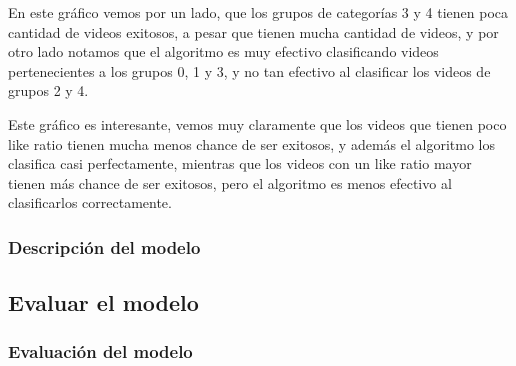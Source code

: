         \def\path{clasif_error_category.png}
        \def\text{Clasif. errors vs category}
        

        En este gráfico vemos por un lado, que los grupos de categorías 3 y 4
        tienen poca cantidad de videos exitosos, a pesar que tienen mucha
        cantidad de videos, y por otro lado notamos que el algoritmo es muy
        efectivo clasificando videos pertenecientes a los grupos 0, 1 y 3, y
        no tan efectivo al clasificar los videos de grupos 2 y 4.

        \def\path{clasif_error_likes_ratio.png}
        \def\text{Clasif. errors vs like ratio}
        

        Este gráfico es interesante, vemos muy claramente que los videos que
        tienen poco like ratio tienen mucha menos chance de ser exitosos, y
        además el algoritmo los clasifica casi perfectamente, mientras que los
        videos con un like ratio mayor tienen más chance de ser exitosos, pero
        el algoritmo es menos efectivo al clasificarlos correctamente.

        \newpage

    \subsubsection{Descripción del modelo}
\subsection{Evaluar el modelo}
    \subsubsection{Evaluación del modelo}

